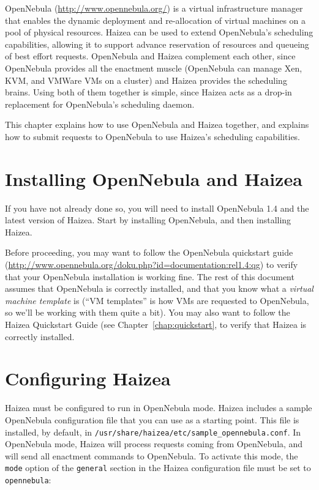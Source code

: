 OpenNebula (\url{http://www.opennebula.org/}) is a virtual infrastructure manager that enables the dynamic deployment and re-allocation of virtual machines on a pool of physical resources. Haizea can be used to extend OpenNebula's scheduling capabilities, allowing it to support advance reservation of resources and queueing of best effort requests. OpenNebula and Haizea complement each other, since OpenNebula provides all the enactment muscle (OpenNebula can manage Xen, KVM, and VMWare VMs on a cluster) and Haizea provides the scheduling brains. Using both of them together is simple, since Haizea acts as a drop-in replacement for OpenNebula's scheduling daemon. 

This chapter explains how to use OpenNebula and Haizea together, and explains how to submit requests to OpenNebula to use Haizea's scheduling capabilities.

\section{Installing OpenNebula and Haizea}

If you have not already done so, you will need to install OpenNebula 1.4 and the latest version of Haizea. Start by installing OpenNebula, and then installing Haizea.

Before proceeding, you may want to follow the OpenNebula quickstart guide (\url{http://www.opennebula.org/doku.php?id=documentation:rel1.4:qg}) to verify that your OpenNebula installation is working fine. The rest of this document assumes that OpenNebula is correctly installed, and that you know what a \emph{virtual machine template} is (``VM templates'' is how VMs are requested to OpenNebula, so we'll be working with them quite a bit). You may also want to follow the Haizea Quickstart Guide (see Chapter~\ref{chap:quickstart}, to verify that Haizea is correctly installed.

\section{Configuring Haizea}

Haizea must be configured to run in OpenNebula mode. Haizea includes a sample OpenNebula configuration file that you can use as a starting point. This file is installed, by default, in \texttt{/usr/share/haizea/etc/sample\_opennebula.conf}. In OpenNebula mode, Haizea will process requests coming from OpenNebula, and will send all enactment commands to OpenNebula. To activate this mode, the \texttt{mode} option of the \texttt{general} section in the Haizea configuration file must be set to \texttt{opennebula}:

